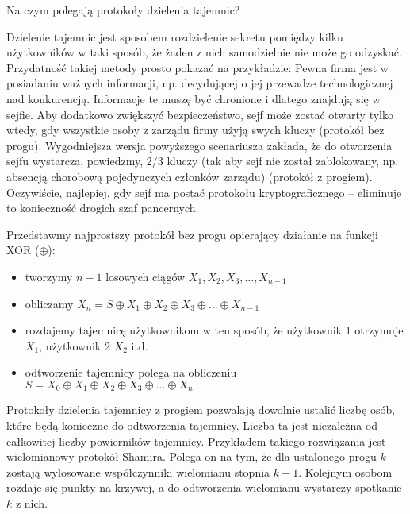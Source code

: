 \documentclass[answers,11pt]{exam}
\begin{document}
\begin{questions}

\question Na czym polegają protokoły dzielenia tajemnic? 
\begin{solution}
Dzielenie tajemnic jest sposobem rozdzielenie sekretu pomiędzy kilku użytkowników w taki sposób, że żaden z nich samodzielnie nie może go odzyskać. Przydatność takiej metody prosto pokazać na przykładzie: Pewna firma jest w posiadaniu ważnych informacji, np. decydującej o jej przewadze technologicznej nad konkurencją. Informacje te muszę być chronione i dlatego znajdują się w sejfie. Aby dodatkowo zwiększyć bezpieczeństwo, sejf może zostać otwarty tylko wtedy, gdy wszystkie osoby z zarządu firmy użyją swych kluczy (protokół bez progu). Wygodniejsza wersja powyższego scenariusza zakłada, że do otworzenia sejfu wystarcza, powiedzmy, 2/3 kluczy (tak aby sejf nie został zablokowany, np. absencją chorobową pojedynczych członków zarządu) (protokół z progiem). Oczywiście, najlepiej, gdy sejf ma postać protokołu kryptograficznego – eliminuje to konieczność drogich szaf pancernych.
\end{solution}

\begin{solution}
Przedstawmy najprostszy protokół bez progu opierający działanie na funkcji XOR ($\oplus$):
\begin{itemize}
\item tworzymy $n-1$ losowych ciągów $X_1, X_2, X_3, ..., X_{n-1}$
\item obliczamy $X_n = S \oplus X_1 \oplus X_2 \oplus X_3 \oplus ... \oplus X_{n-1}$ 
\item rozdajemy tajemnicę użytkownikom w ten sposób, że użytkownik 1 otrzymuje $X_1$, użytkownik 2 $X_2$ itd.
\item odtworzenie tajemnicy polega na obliczeniu $S = X_0 \oplus X_1 \oplus X_2 \oplus X_3 \oplus ... \oplus X_{n}$
\end{itemize}
\end{solution}

\begin{solution}
Protokoły dzielenia tajemnicy z progiem pozwalają dowolnie ustalić liczbę osób, które będą konieczne do odtworzenia tajemnicy. Liczba ta jest niezależna od całkowitej liczby powierników tajemnicy. Przykładem takiego rozwiązania jest wielomianowy protokół Shamira. Polega on na tym, że dla ustalonego progu $k$ zostają wylosowane współczynniki wielomianu stopnia $k-1$. Kolejnym osobom rozdaje się punkty na krzywej, a do odtworzenia wielomianu wystarczy spotkanie $k$ z nich.
\end{solution}

\end{questions}
\end{document}
